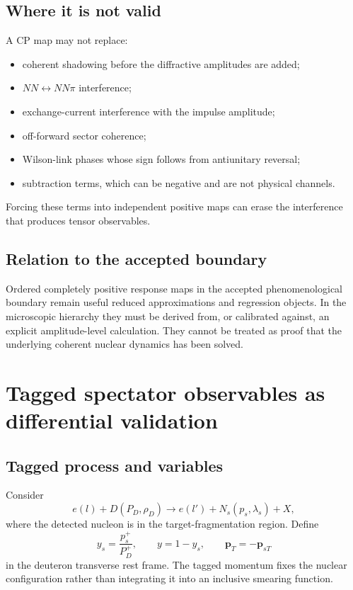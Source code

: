 \documentclass[11pt]{article}
\newcommand{\pT}{\bm{p}_{T}}
\begin{document}
\subsection{Where it is not valid}

A CP map may not replace:
\begin{itemize}
\item coherent shadowing before the diffractive amplitudes are added;
\item \(NN\leftrightarrow NN\pi\) interference;
\item exchange-current interference with the impulse amplitude;
\item off-forward sector coherence;
\item Wilson-link phases whose sign follows from antiunitary reversal;
\item subtraction terms, which can be negative and are not physical channels.
\end{itemize}
Forcing these terms into independent positive maps can erase the interference
that produces tensor observables.

\subsection{Relation to the accepted boundary}

Ordered completely positive response maps in the accepted phenomenological
boundary remain useful reduced approximations and regression objects.  In the
microscopic hierarchy they must be derived from, or calibrated against, an
explicit amplitude-level calculation.  They cannot be treated as proof that
the underlying coherent nuclear dynamics has been solved.

\section{Tagged spectator observables as differential validation}
\label{sec:tagged-observables}

\subsection{Tagged process and variables}

Consider
\begin{equation}
 e(l)+D(P_D,\rho_D)
 \longrightarrow
 e(l')+N_s(p_s,\lambda_s)+X,
\label{eq:tagged-process}
\end{equation}
where the detected nucleon is in the target-fragmentation region.  Define
\begin{equation}
 y_s=\frac{p_s^+}{P_D^+},
 \qquad
 y=1-y_s,
 \qquad
 \pT=-\bm p_{sT}
\label{eq:tagged-variables}
\end{equation}
in the deuteron transverse rest frame.  The tagged momentum fixes the nuclear
configuration rather than integrating it into an inclusive smearing function.
\end{document}

